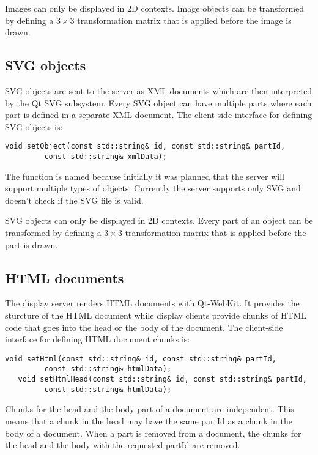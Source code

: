 Images can only be displayed in 2D contexts. Image objects can be transformed
by defining a $3 \times 3$ transformation matrix that is applied before
the image is drawn.

\subsection{SVG objects}

SVG objects are sent to the server as XML documents which are then interpreted
by the Qt SVG subsystem. Every SVG object can have multiple parts where each
part is defined in a separate XML document.
The client-side interface for defining SVG objects is:

\begin{Verbatim}[fontsize=\scriptsize,gobble=3]
   void setObject(const std::string& id, const std::string& partId,
         const std::string& xmlData); 
\end{Verbatim}

The function is named  because initially it was planned that
the server will support multiple types of objects. Currently the server
supports only SVG and doesn't check if the SVG file is valid.

SVG objects can only be displayed in 2D contexts. Every part of an object can
be transformed by defining a $3 \times 3$ transformation matrix that is applied
before the part is drawn.

\subsection{HTML documents}

The display server renders HTML documents with Qt-WebKit. It provides the
sturcture of the HTML document while display clients provide chunks of
HTML code that goes into the head or the body of the document.
The client-side interface for defining HTML document chunks is:

\begin{Verbatim}[fontsize=\scriptsize,gobble=3]
   void setHtml(const std::string& id, const std::string& partId,
         const std::string& htmlData); 
   void setHtmlHead(const std::string& id, const std::string& partId,
         const std::string& htmlData); 
\end{Verbatim}

Chunks for the head and the body part of a document are independent. This means
that a chunk in the head may have the same partId as a chunk in the body of
a document. When a part is removed from a document, the chunks for the head
and the body with the requested partId are removed.

